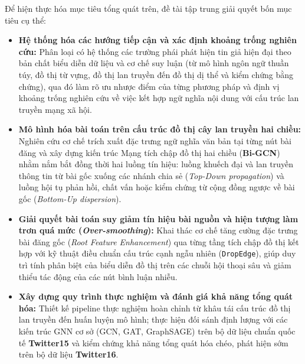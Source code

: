 \documentclass[11pt,a4paper]{extreport}
\begin{document}
Để hiện thực hóa mục tiêu tổng quát trên, đề tài tập trung giải quyết bốn mục tiêu cụ thể:
\begin{itemize}
    \item \textbf{Hệ thống hóa các hướng tiếp cận và xác định khoảng trống nghiên cứu:} Phân loại có hệ thống các trường phái phát hiện tin giả hiện đại theo bản chất biểu diễn dữ liệu và cơ chế suy luận (từ mô hình ngôn ngữ thuần túy, đồ thị từ vựng, đồ thị lan truyền đến đồ thị dị thể và kiểm chứng bằng chứng), qua đó làm rõ ưu nhược điểm của từng phương pháp và định vị khoảng trống nghiên cứu về việc kết hợp ngữ nghĩa nội dung với cấu trúc lan truyền mạng xã hội.
    \item \textbf{Mô hình hóa bài toán trên cấu trúc đồ thị cây lan truyền hai chiều:} Nghiên cứu cơ chế trích xuất đặc trưng ngữ nghĩa văn bản tại từng nút bài đăng và xây dựng kiến trúc Mạng tích chập đồ thị hai chiều (\textbf{Bi-GCN}) nhằm nắm bắt đồng thời hai luồng tín hiệu: luồng khuếch đại và lan truyền thông tin từ bài gốc xuống các nhánh chia sẻ (\textit{Top-Down propagation}) và luồng hội tụ phản hồi, chất vấn hoặc kiểm chứng từ cộng đồng ngược về bài gốc (\textit{Bottom-Up dispersion}).
    \item \textbf{Giải quyết bài toán suy giảm tín hiệu bài nguồn và hiện tượng làm trơn quá mức (\textit{Over-smoothing}):} Khai thác cơ chế tăng cường đặc trưng bài đăng gốc (\textit{Root Feature Enhancement}) qua từng tầng tích chập đồ thị kết hợp với kỹ thuật điều chuẩn cấu trúc cạnh ngẫu nhiên (\texttt{DropEdge}), giúp duy trì tính phân biệt của biểu diễn đồ thị trên các chuỗi hội thoại sâu và giảm thiểu tác động của các nút bình luận nhiễu.
    \item \textbf{Xây dựng quy trình thực nghiệm và đánh giá khả năng tổng quát hóa:} Thiết kế pipeline thực nghiệm hoàn chỉnh từ khâu tái cấu trúc đồ thị lan truyền đến huấn luyện mô hình; thực hiện đối sánh định lượng với các kiến trúc GNN cơ sở (GCN, GAT, GraphSAGE) trên bộ dữ liệu chuẩn quốc tế \textbf{Twitter15} và kiểm chứng khả năng tổng quát hóa chéo, phát hiện sớm trên bộ dữ liệu \textbf{Twitter16}.
\end{itemize}
\end{document}
